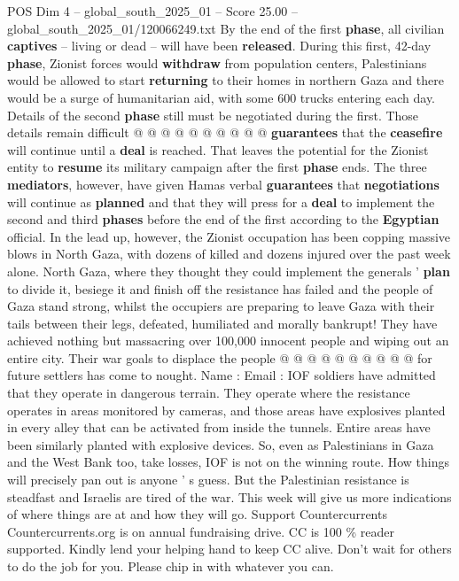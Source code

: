 \begin{textsample}{POS Dim 4 – global\_south\_2025\_01 – Score 25.00 – global\_south\_2025\_01/120066249.txt}
By the end of the first \textbf{phase}, all civilian \textbf{captives} -- living or dead -- will have been \textbf{released}.
During this first, 42-day \textbf{phase}, Zionist forces would \textbf{withdraw} from population centers, Palestinians would be allowed to start \textbf{returning} to their homes in northern Gaza and there would be a surge of humanitarian aid, with some 600 trucks entering each day.
Details of the second \textbf{phase} still must be negotiated during the first.
Those details remain difficult @ @ @ @ @ @ @ @ @ @ \textbf{guarantees} that the \textbf{ceasefire} will continue until a \textbf{deal} is reached.
That leaves the potential for the Zionist entity to \textbf{resume} its military campaign after the first \textbf{phase} ends.
The three \textbf{mediators}, however, have given Hamas verbal \textbf{guarantees} that \textbf{negotiations} will continue as \textbf{planned} and that they will press for a \textbf{deal} to implement the second and third \textbf{phases} before the end of the first according to the \textbf{Egyptian} official.
In the lead up, however, the Zionist occupation has been copping massive blows in North Gaza, with dozens of killed and dozens injured over the past week alone.
North Gaza, where they thought they could implement the generals ' \textbf{plan} to divide it, besiege it and finish off the resistance has failed and the people of Gaza stand strong, whilst the occupiers are preparing to leave Gaza with their tails between their legs, defeated, humiliated and morally bankrupt!
They have achieved nothing but massacring over 100,000 innocent people and wiping out an entire city.
Their war goals to displace the people @ @ @ @ @ @ @ @ @ @ for future settlers has come to nought.
Name : Email : IOF soldiers have admitted that they operate in dangerous terrain.
They operate where the resistance operates in areas monitored by cameras, and those areas have explosives planted in every alley that can be activated from inside the tunnels.
Entire areas have been similarly planted with explosive devices.
So, even as Palestinians in Gaza and the West Bank too, take losses, IOF is not on the winning route.
How things will precisely pan out is anyone ' s guess.
But the Palestinian resistance is steadfast and Israelis are tired of the war.
This week will give us more indications of where things are at and how they will go.
Support Countercurrents Countercurrents.org is on annual fundraising drive.
CC is 100 \% reader supported.
Kindly lend your helping hand to keep CC alive.
Don't wait for others to do the job for you.
Please chip in with whatever you can.

\end{textsample}
